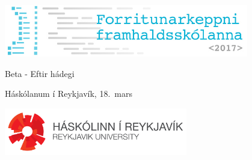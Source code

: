 \documentclass[12pt,a4paper]{problemset}
\begin{document}
\begin{titlepage}
    \centering
    \includegraphics[width=0.8\textwidth]{fklogo}\\
    \vspace{1cm}
    {\Huge Beta - Eftir hádegi \par}
    \vspace{0.5cm}
    {\LARGE Háskólanum í Reykjavík, 18.\ mars \par}
    \vspace{2cm}
    { \Huge \tableofcontents }
    \vfill
    \includegraphics[width=0.6\textwidth]{horizontal_white.png}
\end{titlepage}

\setcounter{problemcount}{6}

\end{document}
